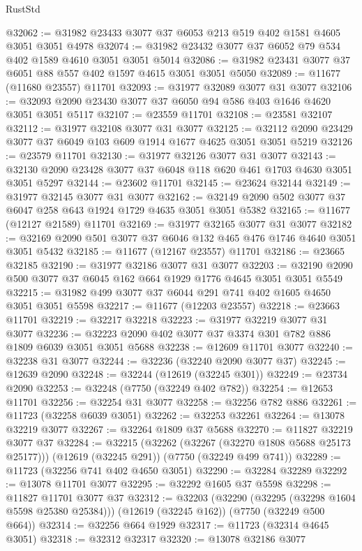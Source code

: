 \begin{lexlean}{RustStd}
\begin{coremodule}
@32062 := @31982 @23433 @3077 @37 @6053 @213 @519 @402 @1581 @4605 @3051 @3051 @4978
@32074 := @31982 @23432 @3077 @37 @6052 @79 @534 @402 @1589 @4610 @3051 @3051 @5014
@32086 := @31982 @23431 @3077 @37 @6051 @88 @557 @402 @1597 @4615 @3051 @3051 @5050
@32089 := @11677 (@11680 @23557) @11701
@32093 := @31977 @32089 @3077 @31 @3077
@32106 := @32093 @2090 @23430 @3077 @37 @6050 @94 @586 @403 @1646 @4620 @3051 @3051 @5117
@32107 := @23559 @11701
@32108 := @23581 @32107
@32112 := @31977 @32108 @3077 @31 @3077
@32125 := @32112 @2090 @23429 @3077 @37 @6049 @103 @609 @1914 @1677 @4625 @3051 @3051 @5219
@32126 := @23579 @11701
@32130 := @31977 @32126 @3077 @31 @3077
@32143 := @32130 @2090 @23428 @3077 @37 @6048 @118 @620 @461 @1703 @4630 @3051 @3051 @5297
@32144 := @23602 @11701
@32145 := @23624 @32144
@32149 := @31977 @32145 @3077 @31 @3077
@32162 := @32149 @2090 @502 @3077 @37 @6047 @258 @643 @1924 @1729 @4635 @3051 @3051 @5382
@32165 := @11677 (@12127 @21589) @11701
@32169 := @31977 @32165 @3077 @31 @3077
@32182 := @32169 @2090 @501 @3077 @37 @6046 @132 @465 @476 @1746 @4640 @3051 @3051 @5432
@32185 := @11677 (@12167 @23557) @11701
@32186 := @23665 @32185
@32190 := @31977 @32186 @3077 @31 @3077
@32203 := @32190 @2090 @500 @3077 @37 @6045 @162 @664 @1929 @1776 @4645 @3051 @3051 @5549
@32215 := @31982 @499 @3077 @37 @6044 @291 @741 @402 @1605 @4650 @3051 @3051 @5598
@32217 := @11677 (@12203 @23557)
@32218 := @23663 @11701
@32219 := @32217 @32218
@32223 := @31977 @32219 @3077 @31 @3077
@32236 := @32223 @2090 @402 @3077 @37 @3374 @301 @782 @886 @1809 @6039 @3051 @3051 @5688
@32238 := @12609 @11701 @3077
@32240 := @32238 @31 @3077
@32244 := @32236 (@32240 @2090 @3077 @37)
@32245 := @12639 @2090
@32248 := @32244 (@12619 (@32245 @301))
@32249 := @23734 @2090
@32253 := @32248 (@7750 (@32249 @402 @782))
@32254 := @12653 @11701
@32256 := @32254 @31 @3077
@32258 := @32256 @782 @886
@32261 := @11723 (@32258 @6039 @3051)
@32262 := @32253 @32261
@32264 := @13078 @32219 @3077
@32267 := @32264 @1809 @37 @5688
@32270 := @11827 @32219 @3077 @37
@32284 := @32215
    (@32262 (@32267 (@32270 @1808 @5688 @25173 @25177)))
    (@12619 (@32245 @291))
    (@7750 (@32249 @499 @741))
@32289 := @11723 (@32256 @741 @402 @4650 @3051)
@32290 := @32284 @32289
@32292 := @13078 @11701 @3077
@32295 := @32292 @1605 @37 @5598
@32298 := @11827 @11701 @3077 @37
@32312 := @32203
    (@32290 (@32295 (@32298 @1604 @5598 @25380 @25384)))
    (@12619 (@32245 @162))
    (@7750 (@32249 @500 @664))
@32314 := @32256 @664 @1929
@32317 := @11723 (@32314 @4645 @3051)
@32318 := @32312 @32317
@32320 := @13078 @32186 @3077

\end{coremodule}
\end{lexlean}

